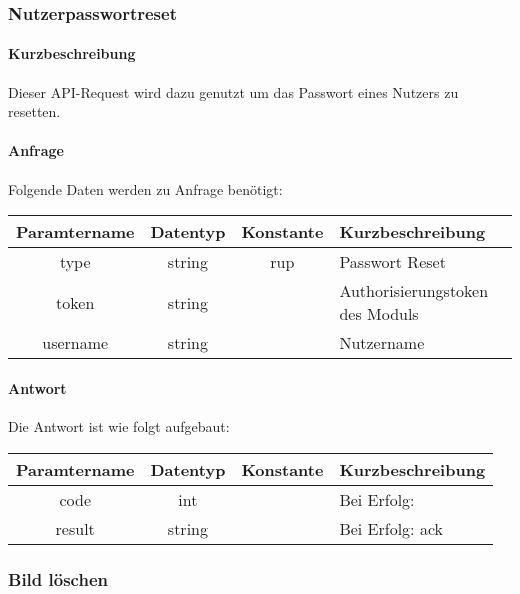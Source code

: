 \subsubsection{Nutzerpasswortreset}
\paragraph{Kurzbeschreibung}Dieser API-Request wird dazu genutzt um das Passwort eines Nutzers zu resetten.
\paragraph{Anfrage}Folgende Daten werden zu Anfrage benötigt:
\begin{table}[H]
	\begin{tabular}{|c|c|c|p{6.5cm}|}
		\hline
		\textbf{Paramtername} & \textbf{Datentyp} & \textbf{Konstante} & \textbf{Kurzbeschreibung}                                                                                               \\ \hline
		type                & string            & rup                & Passwort Reset \\ \hline
		token               & string            &                    & Authorisierungstoken des Moduls \\ \hline
		username            & string            &                    & Nutzername \\ \hline
	\end{tabular}
\end{table}
\paragraph{Antwort}Die Antwort ist wie folgt aufgebaut:
\begin{table}[H]
	\begin{tabular}{|c|c|c|p{6.5cm}|}
		\hline
		\textbf{Paramtername} & \textbf{Datentyp} & \textbf{Konstante} & \textbf{Kurzbeschreibung}            \\ \hline                
		code                & int              &                 & Bei Erfolg: {\glqq 0\grqq} \\ \hline
		result              & string           &                 & Bei Erfolg: {\glqq ack\grqq} \\ \hline
	\end{tabular}
\end{table}
\subsubsection{Bild löschen}
